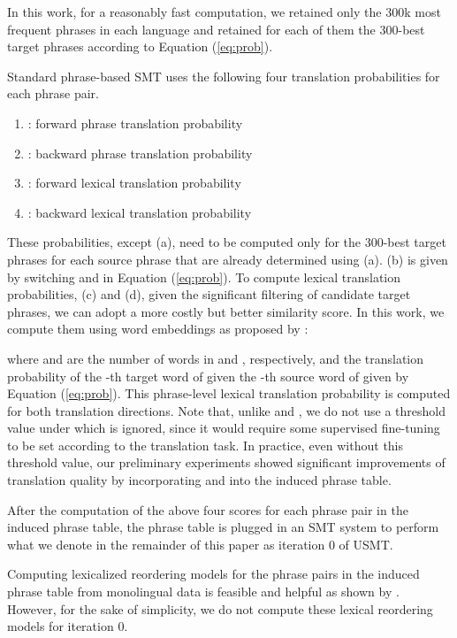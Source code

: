 \documentclass[11pt,a4paper]{article}
\newcommand{\Eq}[1]{{Equation (\ref{eq:#1})}}
\begin{document}
In this work, for a reasonably fast computation, we retained only the 300k most frequent phrases in each language and retained for each of them the 300-best target phrases according to \Eq{prob}.

Standard phrase-based SMT uses the following four translation probabilities for each phrase pair.
\begin{enumerate}[label=(\alph*)]\itemsep=0mm
\item : forward phrase translation probability
\item : backward phrase translation probability
\item : forward lexical translation probability
\item : backward lexical translation probability
\end{enumerate} 
These probabilities, except (a), need to be computed only for the 300-best target phrases for each source phrase that are already determined using (a). (b) is given by switching  and  in \Eq{prob}. To compute lexical translation probabilities, (c) and (d), given the significant filtering of candidate target phrases, we can adopt a more costly but better similarity score.
In this work, we compute them using word embeddings as proposed by \citet{N15-1138}:

where  and  are the number of words in  and , respectively, and  the translation probability of the -th target word  of  given the -th source word  of  given by \Eq{prob}.  This phrase-level lexical translation probability is computed for both translation directions.
Note that, unlike \citet{N15-1138} and \citet{C16-1109}, we do not use a threshold value under which  is ignored, since it would require some supervised fine-tuning to be set according to the translation task. In practice, even without this threshold value, our preliminary experiments showed significant improvements of translation quality by incorporating  and   into the induced phrase table.

After the computation of the above four scores for each phrase pair in the induced phrase table, the phrase table is plugged in an SMT system to perform what we denote in the remainder of this paper as iteration 0 of USMT.

Computing lexicalized reordering models for the phrase pairs in the induced phrase table from monolingual data is feasible and helpful as shown by \citet{klementiev-EtAl:2012:EACL2012}. However, for the sake of simplicity, we do not compute these lexical reordering models for iteration 0.
\end{document}
